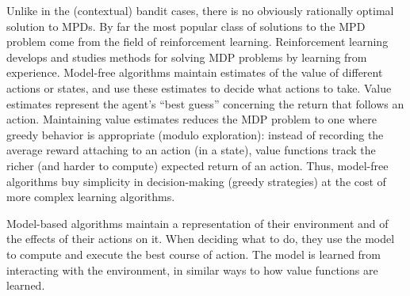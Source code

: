 \documentclass{article}
\begin{document}
Unlike in the (contextual) bandit cases, there is no obviously rationally optimal solution to MPDs.
By far the most popular class of solutions to the MPD problem come from the field of reinforcement learning.
Reinforcement learning develops and studies methods for solving MDP problems by learning from experience.
Model-free algorithms maintain estimates of the value of different actions or states, and use these estimates to decide what actions to take.
Value estimates represent the agent's ``best guess'' concerning the return that follows an action.
Maintaining value estimates reduces the MDP problem to one where greedy behavior is appropriate (modulo exploration): instead of recording the average reward attaching to an action (in a state), value functions track the richer (and harder to compute) expected return of an action.
Thus, model-free algorithms buy simplicity in decision-making (greedy strategies) at the cost of more complex learning algorithms.

Model-based algorithms maintain a representation of their environment and of the effects of their actions on it.
When deciding what to do, they use the model to compute and execute the best course of action.
The model is learned from interacting with the environment, in similar ways to how value functions are learned.
\end{document}
